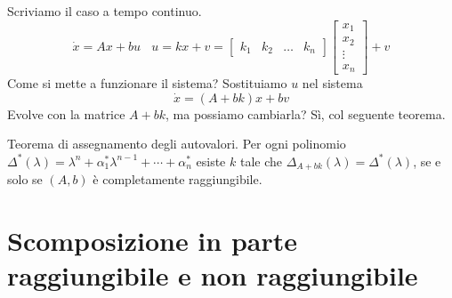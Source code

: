 \documentclass[10pt,a4paper]{book}
\begin{document}
\begin{figure}[htpb]
\end{figure}\FloatBarrier

Scriviamo il caso a tempo continuo.
\begin{equation*}
\dot{x} =Ax+bu\ \ \ \ \boxed{u=kx+v} =\begin{bmatrix}
k_{1} & k_{2} & \dotsc  & k_{n}
\end{bmatrix}\begin{bmatrix}
x_{1}\\
x_{2}\\
\vdots \\
x_{n}
\end{bmatrix} +v
\end{equation*}
Come si mette a funzionare il sistema? Sostituiamo $u$ nel sistema
\begin{equation*}
\boxed{\dot{x} =( A+bk) x+bv}
\end{equation*}
Evolve con la matrice $A+bk$, ma possiamo cambiarla? Sì, col seguente teorema.
\begin{theorem}
Teorema di assegnamento degli autovalori. Per ogni polinomio $\Delta ^{*}( \lambda ) =\lambda ^{n} +\alpha ^{*}_{1} \lambda ^{n-1} +\cdots +\alpha ^{*}_{n}$ esiste $k$ tale che $\Delta _{A+bk}( \lambda ) =\Delta ^{*}( \lambda )$, se e solo se $( A,b)$ è completamente raggiungibile.
\end{theorem}
\section{Scomposizione in parte raggiungibile e non raggiungibile}
\end{document}
